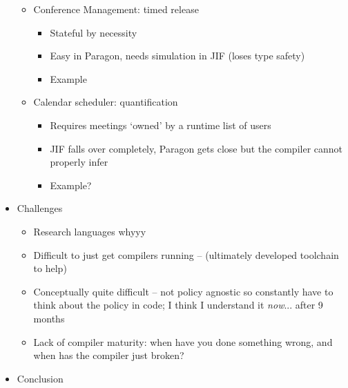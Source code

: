 \begin{itemize}
\begin{itemize}
		\item Conference Management: timed release
		
		\begin{itemize}
			
			\item Stateful by necessity
			
			\item Easy in Paragon, needs simulation in JIF (loses type safety)
			
			\item Example
			
		\end{itemize}
	
		\item Calendar scheduler: quantification
		
		\begin{itemize}
			
			\item Requires meetings `owned' by a runtime list of users
			
			\item JIF falls over completely, Paragon gets close but the compiler cannot properly infer
			
			\item Example?
			
		\end{itemize}
		
	\end{itemize}
	
	\item Challenges
	
	\begin{itemize}
		
		\item Research languages whyyy
		
		\item Difficult to just get compilers running -- (ultimately developed toolchain to help)
		
		\item Conceptually quite difficult -- not policy agnostic so constantly have to think about the policy in code; I think I understand it \textit{now}... after 9 months
		
		\item Lack of compiler maturity: when have you done something wrong, and when has the compiler just broken?
		
	\end{itemize}

	\item Conclusion
	

\end{itemize}

